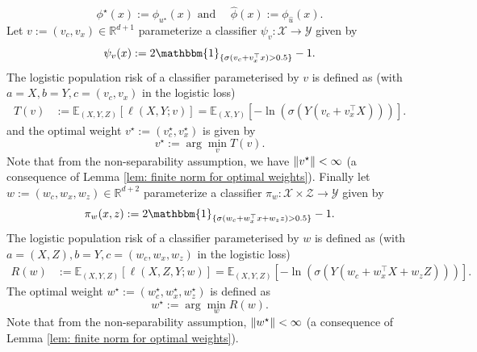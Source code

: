 \begin{equation}\label{eqn: phi star and phi hat}
    \phi^\star(x) := \phi_{u^\star}(x) \text{ and } \quad \hat{\phi}(x) := \phi_{\hat{u}}(x).
\end{equation}
Let $ v := (v_c, v_x) \in \mathbb{R}^{d+1} $ parameterize a classifier $ \psi_v: \mathcal{X} \rightarrow \mathcal{Y} $ given by
\begin{equation*}
    \psi_v(x) := 2\mathbbm{1}_{\{\sigma(v_c + v_x^\top x) > 0.5\}} - 1.
\end{equation*}
The logistic population risk of a classifier parameterised by $v$ is defined as (with $a = X, b= Y, c = (v_c, v_x)$ in the logistic loss)
\begin{equation*}
\begin{aligned}
    T(v) &:= \mathbb{E}_{(X, Y, Z)}[\ell(X, Y; v)] = \mathbb{E}_{(X, Y)}[-\ln(\sigma(Y(v_c + v_x^\top X)))].
\end{aligned}
\end{equation*}
and the optimal weight $ v^\star := (v^\star_c, v^\star_x) $ is given by
\begin{equation}\label{eqn: v star}
    v^\star := \arg\min_v T(v).
\end{equation}
Note that from the non-separability assumption, we have $\lVert v^\star \rVert < \infty$ (a consequence of Lemma \ref{lem: finite norm for optimal weights}).
Finally let $ w := (w_c, w_x, w_z) \in \mathbb{R}^{d+2} $ parameterize a classifier $ \pi_w: \mathcal{X} \times \mathcal{Z} \rightarrow \mathcal{Y} $ given by
\begin{equation*}
    \pi_w(x, z) := 2\mathbbm{1}_{\{\sigma(w_c + w_x^\top x + w_z z) > 0.5\}} - 1.
\end{equation*}
The logistic population risk of a classifier parameterised by $w$ is defined as (with $a = (X, Z), b= Y, c = (w_c, w_x, w_z)$ in the logistic loss)
\begin{equation*}\label{eqn: Logistic risk}
\begin{aligned}
    R(w) &:= \mathbb{E}_{(X, Y, Z)}[\ell(X, Z, Y; w)] = \mathbb{E}_{(X, Y, Z)}[-\ln(\sigma(Y(w_c + w_x^\top X + w_z Z)))].
\end{aligned}
\end{equation*}
The optimal weight $ w^\star := (w^\star_c, w^\star_x, w^\star_z) $ is defined as
\begin{equation}\label{eqn: w star}
    w^\star := \arg\min_w R(w).
\end{equation}
Note that from the non-separability assumption, $\lVert w^\star \rVert < \infty$ (a consequence of Lemma \ref{lem: finite norm for optimal weights}).
